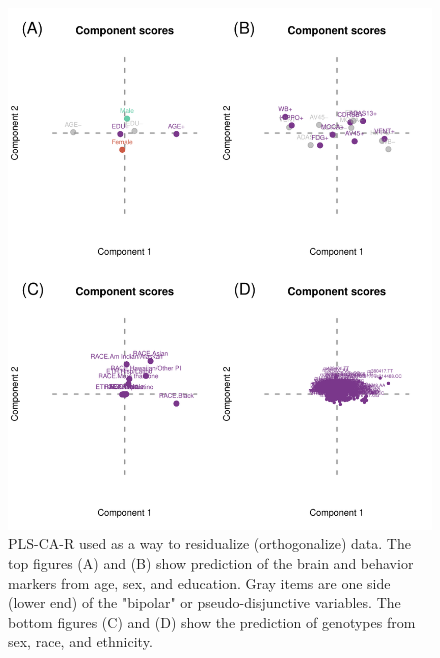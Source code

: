 \documentclass[12pt]{article}
\begin{document}
\begin{figure}[!hbtp]

{\centering \includegraphics[width=.8\textwidth,height=.8\textheight]{PLSCAR_to_a_GPLS_blind_files/figure-latex/unnamed-chunk-8-1} 

}

\caption{\label{fig:confound_predictors_ex2} PLS-CA-R used as a way to residualize (orthogonalize) data. The top figures (A) and (B) show prediction of the brain and behavior markers from age, sex, and education. Gray items are one side (lower end) of the "bipolar" or pseudo-disjunctive variables. The bottom figures (C) and (D) show the prediction of genotypes from sex, race, and ethnicity.}\label{fig:unnamed-chunk-8}
\end{figure}
\end{document}
